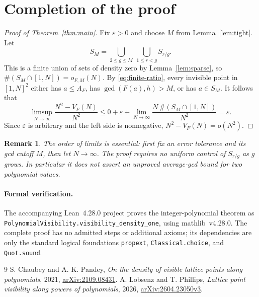 \documentclass[10pt]{article}
\newtheorem{remark}[theorem]{Remark}
\begin{document}
\section{Completion of the proof}
\begin{proof}[Proof of Theorem~\ref{thm:main}]
Fix $\varepsilon>0$ and choose $M$ from Lemma~\ref{lem:tight}.
Let
\[
       S_M=\bigcup_{2\le g\le M}\ \bigcup_{1\le r<g}S_{r/g}.
\]
This is a finite union of sets of density zero by Lemma~\ref{lem:sparse},
so $\#(S_M\cap[1,N])=o_{F,M}(N)$.
By \eqref{eq:finite-ratio}, every invisible point in $[1,N]^2$ either
has $a\le A_F$, has $\gcd(F(a),h)>M$, or has $a\in S_M$.
It follows that
\[
 \limsup_{N\to\infty}\frac{N^2-V_F(N)}{N^2}
 \le 0+\varepsilon+
       \lim_{N\to\infty}\frac{N\,\#(S_M\cap[1,N])}{N^2}
 =\varepsilon.
\]
Since $\varepsilon$ is arbitrary and the left side is nonnegative,
$N^2-V_F(N)=o(N^2)$.
\end{proof}

\begin{remark}
The order of limits is essential: first fix an error tolerance and its
gcd cutoff $M$, then let $N\to\infty$. The proof requires no uniform
control of $S_{r/g}$ as $g$ grows. In particular it does not assert an
unproved average-gcd bound for two polynomial values.
\end{remark}

\paragraph{Formal verification.}
The accompanying Lean~4.28.0 project proves the integer-polynomial theorem
as \texttt{PolynomialVisibility.visibility\_density\_one}, using
mathlib~v4.28.0. The complete proof has no admitted steps or additional
axioms; its dependencies are only the standard logical foundations
\texttt{propext}, \texttt{Classical.choice}, and \texttt{Quot.sound}.

\begin{thebibliography}{9}
 S. Chaubey and A. K. Pandey,
\emph{On the density of visible lattice points along polynomials},
2021, \href{https://arxiv.org/abs/2109.08431}{arXiv:2109.08431}.
 A. Lobsenz and T. Phillips,
\emph{Lattice point visibility along powers of polynomials},
2026, \href{https://arxiv.org/abs/2604.23050v3}{arXiv:2604.23050v3}.
\end{thebibliography}
\end{document}
